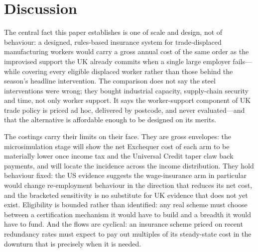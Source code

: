 \section{Discussion}\label{sec:discussion}

The central fact this paper establishes is one of scale and design, not
of behaviour: a designed, rules-based insurance system for
trade-displaced manufacturing workers would carry a gross annual cost of
the same order as the improvised support the UK already commits when a
single large employer fails---while covering every eligible displaced
worker rather than those behind the season's headline intervention. The
comparison does not say the steel interventions were wrong; they bought
industrial capacity, supply-chain security and time, not only worker
support. It says the worker-support component of UK trade policy is
priced ad hoc, delivered by postcode, and never evaluated---and that the
alternative is affordable enough to be designed on its merits.

The costings carry their limits on their face. They are gross envelopes:
the microsimulation stage will show the net Exchequer cost of each arm to
be materially lower once income tax and the Universal Credit taper claw
back payments, and will locate the incidence across the income
distribution. They hold behaviour fixed: the US evidence suggests the
wage-insurance arm in particular would change re-employment behaviour in
the direction that reduces its net cost, and the bracketed sensitivity is
no substitute for UK evidence that does not yet exist. Eligibility is
bounded rather than identified: any real scheme must choose between a
certification mechanism it would have to build and a breadth it would
have to fund. And the flows are cyclical: an insurance scheme priced on
recent redundancy rates must expect to pay out multiples of its
steady-state cost in the downturn that is precisely when it is needed.

